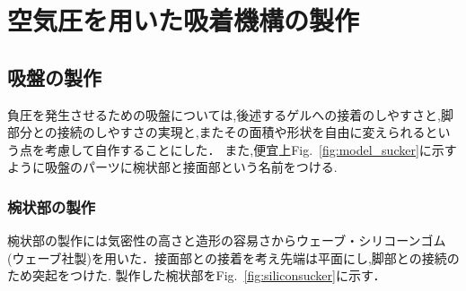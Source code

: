 \documentclass[uplatex,dvipdfmx]{jlreq}
\begin{document}
\section{空気圧を用いた吸着機構の製作}
\subsection{吸盤の製作}
負圧を発生させるための吸盤については,後述するゲルへの接着のしやすさと,脚部分との接続のしやすさの実現と,またその面積や形状を自由に変えられるという点を考慮して自作することにした．
また,便宜上Fig.~\ref{fig:model_sucker}に示すように吸盤のパーツに椀状部と接面部という名前をつける.
\subsubsection{椀状部の製作}
椀状部の製作には気密性の高さと造形の容易さからウェーブ・シリコーンゴム(ウェーブ社製)を用いた．接面部との接着を考え先端は平面にし,脚部との接続のため突起をつけた.
製作した椀状部をFig.~\ref{fig:siliconsucker}に示す．
\end{document}
